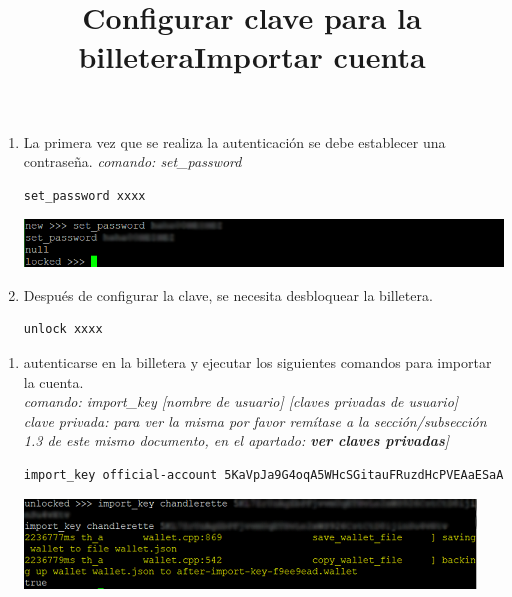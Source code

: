 \documentclass{article}
\begin{document}
\title{Configurar clave para la billetera}
\begin{enumerate}
    \item La primera vez que se realiza la autenticación  se debe establecer una contraseña.
    \emph{comando: set\_password}
    \begin{lstlisting}[language=bash,caption={Configurar password}]
     set_password xxxx
    \end{lstlisting}
     \includegraphics{transfer-2}\\
     \item Después de configurar la clave, se necesita desbloquear la billetera.
      \begin{lstlisting}[language=bash,caption={Configurar password}]
     unlock xxxx
    \end{lstlisting}
\end{enumerate}


 \title{Importar cuenta}
 \begin{enumerate}
    \item autenticarse en la billetera y ejecutar los siguientes comandos para importar la cuenta.\\
    \emph{comando: import\_key [nombre de usuario] [claves privadas de usuario]}\\
    \emph{clave privada: para ver la misma por favor remítase a la sección/subsección 1.3 de este mismo documento, en el apartado: \textbf{\textit{ver claves privadas}}]}\\
    \begin{lstlisting}[language=bash,caption={importar claves privadas}]
     import_key official-account 5KaVpJa9G4oqA5WHcSGitauFRuzdHcPVEAaESaA
    \end{lstlisting}
\includegraphics{transfer-3}
\end{enumerate}
\end{document}
